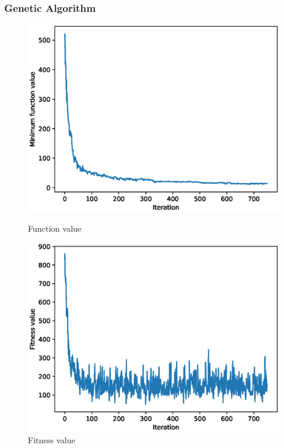 \documentclass{article}
\begin{document}
\subsubsection{Genetic Algorithm}
\begin{figure}[!htbp]
	\centering
	\begin{minipage}{.48\textwidth}
		\centering
		\includegraphics[scale=.4]{experiment_1a_griewangk/min_eval_0.eps}
		\caption{Function value}
	\end{minipage}\hfill
	\begin{minipage}{.48\textwidth}
		\centering
		\includegraphics[scale=.4]{experiment_1a_griewangk/max_fitness_0.eps}
		\caption{Fitness value}
	\end{minipage}
\end{figure}
\FloatBarrier
\end{document}
